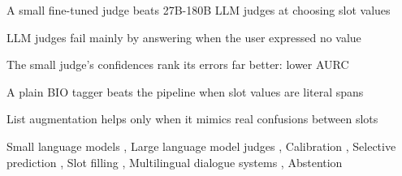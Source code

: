 \documentclass[a4paper,fleqn]{cas-sc}
\begin{document}
\begin{highlights}
\item A small fine-tuned judge beats 27B-180B LLM judges at choosing slot values
\item LLM judges fail mainly by answering when the user expressed no value
\item The small judge's confidences rank its errors far better: lower AURC
\item A plain BIO tagger beats the pipeline when slot values are literal spans
\item List augmentation helps only when it mimics real confusions between slots
\end{highlights}

\begin{keywords}
Small language models \sep
Large language model judges \sep
Calibration \sep
Selective prediction \sep
Slot filling \sep
Multilingual dialogue systems \sep
Abstention
\end{keywords}

\maketitle














\appendix



\end{document}
